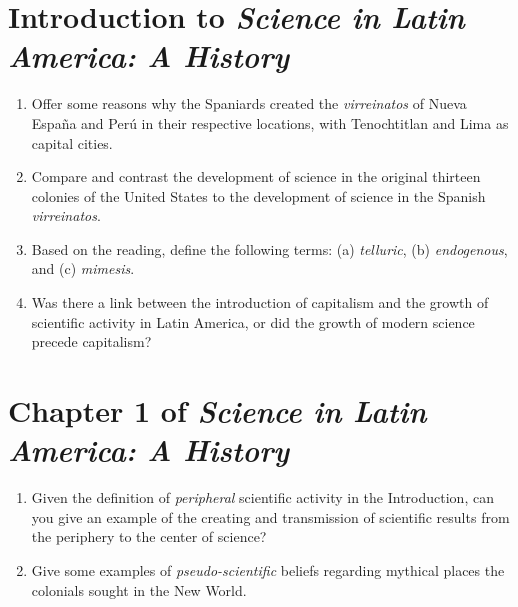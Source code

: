 \documentclass[12pt]{article}
\begin{document}
\maketitle

\section{Introduction to \textit{Science in Latin America: A History}}

\begin{enumerate}
\item Offer some reasons why the Spaniards created the \textit{virreinatos} of Nueva Espa\~{n}a and Per\'{u} in their respective locations, with Tenochtitlan and Lima as capital cities. \\ \vspace{1cm}
\item Compare and contrast the development of science in the original thirteen colonies of the United States to the development of science in the Spanish \textit{virreinatos}. \\ \vspace{1cm}
\item Based on the reading, define the following terms: (a) \textit{telluric}, (b) \textit{endogenous}, and (c) \textit{mimesis}.  \\ \vspace{0.5cm}
\item Was there a link between the introduction of capitalism and the growth of scientific activity in Latin America, or did the growth of modern science precede capitalism? \\ \vspace{0.5cm}
\end{enumerate}

\section{Chapter 1 of \textit{Science in Latin America: A History}}

\begin{enumerate}
\item Given the definition of \textit{peripheral} scientific activity in the Introduction, can you give an example of the creating and transmission of scientific results from the periphery to the center of science? \\ \vspace{1cm}
\item Give some examples of \textit{pseudo-scientific} beliefs regarding mythical places the colonials sought in the New World.
\end{enumerate}
\end{document}
